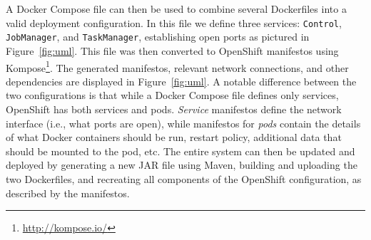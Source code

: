 \documentclass{article}
\begin{document}
A Docker Compose file can then be used to combine several Dockerfiles into a
valid deployment configuration. In this file we define three services:
\texttt{Control}, \texttt{JobManager}, and \texttt{TaskManager}, establishing
open ports as pictured in Figure~\ref{fig:uml}. This file was then converted to
OpenShift manifestos using Kompose\footnote{\url{http://kompose.io/}}. The
generated manifestos, relevant network connections, and other dependencies are
displayed in Figure~\ref{fig:uml}. A notable difference between the two
configurations is that while a Docker Compose file defines only services,
OpenShift has both services and pods. \emph{Service} manifestos define the
network interface (i.e., what ports are open), while manifestos for \emph{pods}
contain the details of what Docker containers should be run, restart policy,
additional data that should be mounted to the pod, etc. The entire system can
then be updated and deployed by generating a new JAR file using Maven, building
and uploading the two Dockerfiles, and recreating all components of the
OpenShift configuration, as described by the manifestos.
\end{document}
